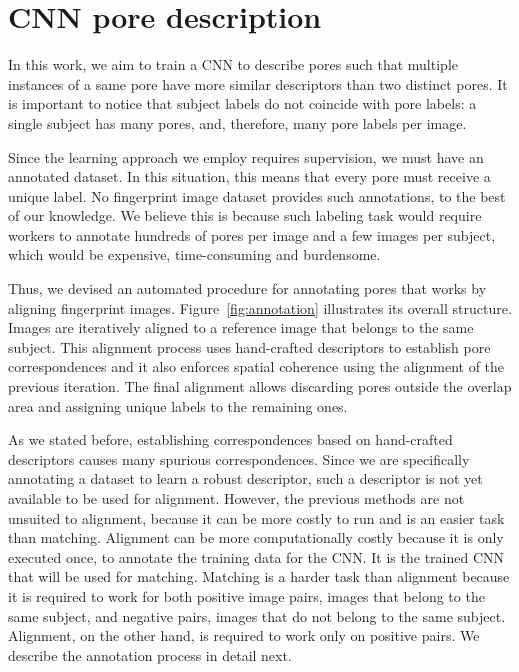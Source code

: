 \documentclass[10pt,twocolumn,letterpaper]{article}
\begin{document}
\section{CNN pore description}
\label{sec:pore-description}
In this work, we aim to train a CNN to describe pores such that multiple instances of a same pore have more similar descriptors than two distinct pores.
It is important to notice that subject labels do not coincide with pore labels: a single subject has many pores, and, therefore, many pore labels per image.

Since the learning approach we employ requires supervision, we must have an annotated dataset.
In this situation, this means that every pore must receive a unique label.
No fingerprint image dataset provides such annotations, to the best of our knowledge.
We believe this is because such labeling task would require workers to annotate hundreds of pores per image and a few images per subject, which would be expensive, time-consuming and burdensome.

Thus, we devised an automated procedure for annotating pores that works by aligning fingerprint images.
Figure~\ref{fig:annotation} illustrates its overall structure.
Images are iteratively aligned to a reference image that belongs to the same subject.
This alignment process uses hand-crafted descriptors to establish pore correspondences and it also enforces spatial coherence using the alignment of the previous iteration.
The final alignment allows discarding pores outside the overlap area and assigning unique labels to the remaining ones.

As we stated before, establishing correspondences based on hand-crafted descriptors causes many spurious correspondences.
Since we are specifically annotating a dataset to learn a robust descriptor, such a descriptor is not yet available to be used for alignment.
However, the previous methods are not unsuited to alignment, because it can be more costly to run and is an easier task than matching.
Alignment can be more computationally costly because it is only executed once, to annotate the training data for the CNN.
It is the trained CNN that will be used for matching.
Matching is a harder task than alignment because it is required to work for both positive image pairs, \ie images that belong to the same subject, and negative pairs, \ie images that do not belong to the same subject.
Alignment, on the other hand, is required to work only on positive pairs.
We describe the annotation process in detail next.
\end{document}
